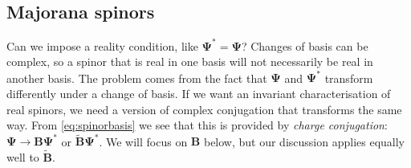 \documentclass[11pt]{article}
\newcommand{\B}{\mathbf{B}}
\newcommand{\Bt}{\widetilde{\B}}
\newcommand{\Psib}{\boldsymbol{\Psi}}
\begin{document}

\subsection{Majorana spinors}\label{sec:majorana}

Can we impose a reality condition, like $\Psib^\ast = \Psib$?
Changes of basis can be complex, so a spinor that is real in one basis will not necessarily be real in another basis.
The problem comes from the fact that $\Psib$ and $\Psib^\ast$ transform differently under a change of basis.
If we want an invariant characterisation of real spinors, we need a version of complex conjugation that transforms the same way.
From \cref{eq:spinorbasis} we see that this is provided by \emph{charge conjugation}: \( \Psib \to \B \Psib^\ast \) or \( \Bt \Psib^\ast \).
We will focus on $\B$ below, but our discussion applies equally well to $\Bt$.
\end{document}

